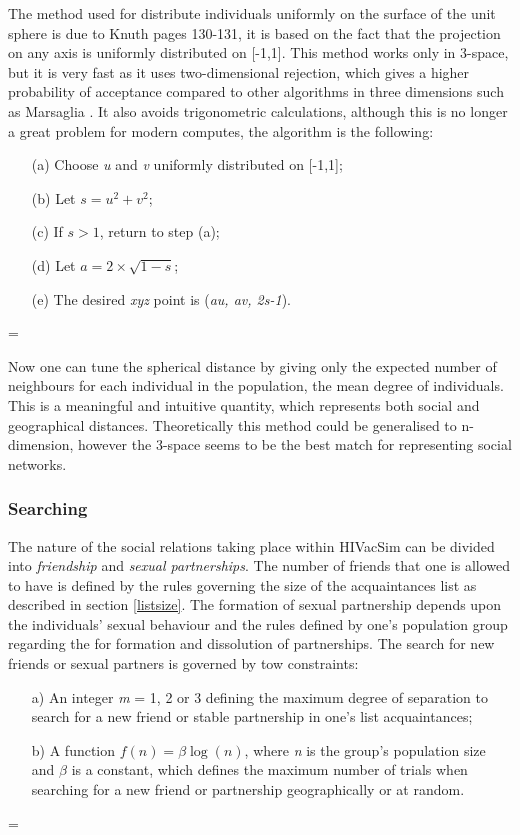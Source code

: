 The method used for distribute individuals uniformly on the surface of the unit sphere is
due to Knuth \cite{Knuth1981} pages 130-131, it is based on the fact that the projection
on any axis is uniformly distributed on [-1,1]. This method works only in 3-space, but it
is very fast as it uses two-dimensional rejection, which gives a higher probability of
acceptance compared to other algorithms in three dimensions such as Marsaglia
\cite{Marsaglia1972}. It also avoids trigonometric calculations, although this is no
longer a great problem for modern computes, the algorithm is the following:
\parskip=0pt
\begin{itemize}
    \item [(a)] Choose \emph{u} and \emph{v} uniformly distributed on [-1,1];\\
    \item [(b)] Let $s = u^2 + v^2$;\\
    \item [(c)] If $s > 1$, return to step (a);\\
    \item [(d)] Let $a = 2 \times \sqrt{1-s}$;\\
    \item [(e)] The desired \emph{xyz} point is (\emph{au, av, 2s-1}).
\end{itemize}
\parskip=\baselineskip

Now one can tune the spherical distance by giving only the expected number of neighbours
for each individual in the population, the mean degree of individuals. This is a
meaningful and intuitive quantity, which represents both social and geographical
distances. Theoretically this method could be generalised to n-dimension, however the
3-space seems to be the best match for representing social networks.

\subsubsection{Searching}

The nature of the social relations taking place within HIVacSim can be divided into
\emph{friendship} and \emph{sexual partnerships}. The number of friends that one is
allowed to have is defined by the rules governing the size of the acquaintances list as
described in section \ref{listsize}. The formation of sexual partnership depends upon the
individuals' sexual behaviour and the rules defined by one's population group regarding
the for formation and dissolution of partnerships. The search for new friends or sexual
partners is governed by tow constraints:
\parskip=0pt
\begin{itemize}
    \item [a)] An integer \emph{m} = 1, 2 or 3 defining the maximum degree of separation
    to search for a new friend or stable partnership in one's list acquaintances;
    \item [b)] A function $f(n)=\beta \log (n)$, where \emph{n} is the group's population
    size and $\beta$ is a constant, which defines the maximum number of trials when
    searching for a new friend or partnership geographically or at random.
\end{itemize}
\parskip=\baselineskip

